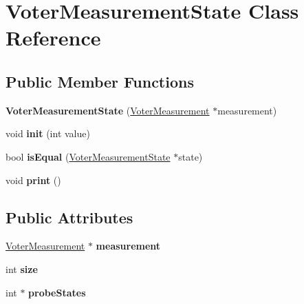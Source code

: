 \hypertarget{classVoterMeasurementState}{\section{Voter\-Measurement\-State Class Reference}
\label{classVoterMeasurementState}
}
\subsection*{Public Member Functions}
\begin{DoxyCompactItemize}
\item 
\hypertarget{classVoterMeasurementState_a35147598e984c9f124284ce82ef1c63a}{{\bfseries Voter\-Measurement\-State} (\hyperlink{classVoterMeasurement}{Voter\-Measurement} $\ast$measurement)}\label{classVoterMeasurementState_a35147598e984c9f124284ce82ef1c63a}

\item 
\hypertarget{classVoterMeasurementState_a0e42569bb960b755395b5eec5b928014}{void {\bfseries init} (int value)}\label{classVoterMeasurementState_a0e42569bb960b755395b5eec5b928014}

\item 
\hypertarget{classVoterMeasurementState_ace14af99c55124ee7a4199c1f2d44b9c}{bool {\bfseries is\-Equal} (\hyperlink{classVoterMeasurementState}{Voter\-Measurement\-State} $\ast$state)}\label{classVoterMeasurementState_ace14af99c55124ee7a4199c1f2d44b9c}

\item 
\hypertarget{classVoterMeasurementState_aa40e89eeb334efa48cba9afaf8aec269}{void {\bfseries print} ()}\label{classVoterMeasurementState_aa40e89eeb334efa48cba9afaf8aec269}

\end{DoxyCompactItemize}
\subsection*{Public Attributes}
\begin{DoxyCompactItemize}
\item 
\hypertarget{classVoterMeasurementState_a7ed3e797dbf98eea1085610aa9b3b2f6}{\hyperlink{classVoterMeasurement}{Voter\-Measurement} $\ast$ {\bfseries measurement}}\label{classVoterMeasurementState_a7ed3e797dbf98eea1085610aa9b3b2f6}

\item 
\hypertarget{classVoterMeasurementState_ae5df2d14e79f6bd4ebb4aafe158c86d3}{int {\bfseries size}}\label{classVoterMeasurementState_ae5df2d14e79f6bd4ebb4aafe158c86d3}

\item 
\hypertarget{classVoterMeasurementState_a89c38e09379dc56c7c9d16542f24a84f}{int $\ast$ {\bfseries probe\-States}}\label{classVoterMeasurementState_a89c38e09379dc56c7c9d16542f24a84f}

\end{DoxyCompactItemize}


